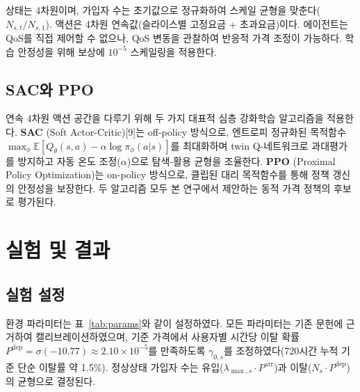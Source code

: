 \documentclass[10pt, twocolumn]{article}
\begin{document}
상태는 4차원이며, 가입자 수는 초기값으로 정규화하여 스케일 균형을 맞춘다($N_{s,t}/N_{s,1}$). 액션은 4차원 연속값(슬라이스별 고정요금 + 초과요금)이다. 에이전트는 QoS를 직접 제어할 수 없으나, QoS 변동을 관찰하여 반응적 가격 조정이 가능하다. 학습 안정성을 위해 보상에 $10^{-5}$ 스케일링을 적용한다.

\subsection{SAC와 PPO}

연속 4차원 액션 공간을 다루기 위해 두 가지 대표적 심층 강화학습 알고리즘을 적용한다. \textbf{SAC} (Soft Actor-Critic)[9]는 off-policy 방식으로, 엔트로피 정규화된 목적함수 $\max_\phi \mathbb{E}[Q_\theta(s,a) - \alpha \log \pi_\phi(a|s)]$를 최대화하며 twin Q-네트워크로 과대평가를 방지하고 자동 온도 조정($\alpha$)으로 탐색-활용 균형을 조율한다. \textbf{PPO} (Proximal Policy Optimization)는 on-policy 방식으로, 클립된 대리 목적함수를 통해 정책 갱신의 안정성을 보장한다. 두 알고리즘 모두 본 연구에서 제안하는 동적 가격 정책의 후보로 평가된다.

\section{실험 및 결과}

\subsection{실험 설정}

환경 파라미터는 표~\ref{tab:params}와 같이 설정하였다. 모든 파라미터는 기존 문헌에 근거하여 캘리브레이션하였으며, 기준 가격에서 사용자별 시간당 이탈 확률 $P^{\text{dep}} = \sigma(-10.77) \approx 2.10 \times 10^{-5}$를 만족하도록 $\gamma_{0,s}$를 조정하였다(720시간 누적 기준 단순 이탈률 약 1.5\%). 정상상태 가입자 수는 유입($\lambda_{\max,s} \cdot P^{\text{arr}}$)과 이탈($N_s \cdot P^{\text{dep}}$)의 균형으로 결정된다.
\end{document}
